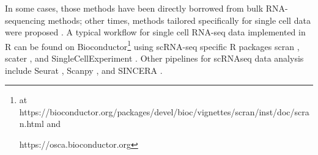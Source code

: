 
In some cases, those methods have been directly borrowed from bulk RNA-sequencing methods; other times, methods tailored specifically for single cell data were proposed \cite{stegle2015computational, zappia2018exploring, luecken2019current}.
A typical workflow for single cell RNA-seq data implemented in R can be found on Bioconductor\footnote{at https://bioconductor.org/packages/devel/bioc/vignettes/scran/inst/doc/scran.html and

https://osca.bioconductor.org} using scRNA-seq specific R packages scran \cite{lun2016step, risso2016scrnaseq}, scater \cite{mccarthy2017scater}, and SingleCellExperiment 
\cite{lun2019singlecellexperiment}.
Other pipelines for scRNAseq data analysis include 
Seurat \cite{butler2018integrating},
Scanpy \cite{wolf2018scanpy}, 
and SINCERA \cite{guo2015sincera}.













